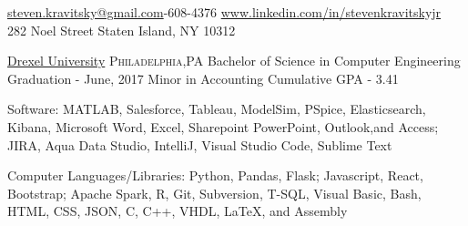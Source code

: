 \documentclass[10pt,letterpaper]{article}
\begin{document}
\sloppy  %




\nobreakvspace{0.3em}  %

\noindent\href{mailto:steven.kravitsky@gmail.com}{steven.kravitsky\mbox{}@\mbox{}gmail.com}-608-4376\sbull
\href{http://www.linkedin.com/in/stevenkravitskyjr}{www.linkedin.com/in/stevenkravitskyjr}
\\
282 Noel Street\sbull
Staten Island, NY 10312

\spacedhrule{0.9em}{-0.4em}  %


\headedsection
  {\href{http://www.drexel.edu/}{Drexel University}}
  {\textsc{Philadelphia,PA}} {%
  \headedsubsectiontwo
    {Bachelor of Science in Computer Engineering}
    {Graduation - June, 2017}
    {Minor in Accounting}
    {Cumulative GPA - 3.41}
}

\spacedhrule{0.9em}{-0.4em}


\inlineheadsection  %
  {Software:}
  {MATLAB, Salesforce, Tableau, ModelSim, PSpice, Elasticsearch, Kibana, Microsoft Word, Excel, Sharepoint PowerPoint, Outlook,and Access; JIRA, Aqua Data Studio, IntelliJ, Visual Studio Code, Sublime Text
  }

\vspace{0.1em}
\inlineheadsection
  {Computer Languages/Libraries:}
  {Python, Pandas, Flask; Javascript, React, Bootstrap; Apache Spark, R, Git, Subversion, T-SQL, Visual Basic, Bash, HTML, CSS,  JSON, C, C++, VHDL, LaTeX, and Assembly}

\spacedhrule{0.9em}{-0.4em}

\end{document}
